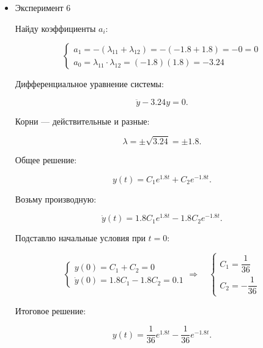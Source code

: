 \documentclass[a4paper,12pt]{article}
\begin{document}
\begin{itemize}
		Дифференциальное уравнение системы:
		
		\[
		\ddot{y} - 12.5 \dot{y} + 39 y = 0
		\]
		
		Корни — действительные и различные, значит решение имеет вид:
		
		\[
		y(t) = C_1 e^{6 t} + C_2 e^{6.5 t}
		\]
		
		Возьму производную:
		
		\[
		\dot{y}(t) = 6 C_1 e^{6 t} + 6.5 C_2 e^{6.5 t}
		\]
		
		Подставлю начальные условия при \(t = 0\):
		
		\[
		\begin{cases}
			y(0) = C_1 + C_2 = 0.05 \\[8pt]
			\dot{y}(0) = 6 C_1 + 6.5 C_2 = 0
		\end{cases} \Rightarrow \quad
		\begin{cases}
			C_1 = 0.65 \\[8pt]
			C_2 = -0.6
		\end{cases} 		
		\]
		
		Итоговое решение:
		
		\[
		y(t) = 0.65 e^{6 t} - 0.6 e^{6.5 t}
		\]
		
		
		\item Эксперимент 6
		
		Найду коэффициенты \(a_i\):
		
		\[
		\begin{cases}
			a_1 = -(\lambda_{11} + \lambda_{12}) = -(-1.8 + 1.8) = -0 = 0 \\[8pt]
			a_0 = \lambda_{11} \cdot \lambda_{12} = (-1.8)(1.8) = -3.24
		\end{cases}
		\]
		
		Дифференциальное уравнение системы:

		\[
		\ddot{y} - 3.24 y = 0.
		\]
		
		Корни — действительные и разные:
		
		\[
		\lambda = \pm \sqrt{3.24} = \pm 1.8.
		\]
		
		Общее решение:
		
		\[
		y(t) = C_1 e^{1.8 t} + C_2 e^{-1.8 t}.
		\]
		
		Возьму производную:
		
		\[
		\dot{y}(t) = 1.8 C_1 e^{1.8 t} - 1.8 C_2 e^{-1.8 t}.
		\]
		
		Подставлю начальные условия при \(t=0\):
		
		\[
		\begin{cases}
			y(0) = C_1 + C_2 = 0 \\[8pt]
			\dot{y}(0) = 1.8 C_1 - 1.8 C_2 = 0.1
		\end{cases} \Rightarrow \quad
		\begin{cases}
		C_1 = \dfrac{1}{36} \\[8pt]
		C_2 = -\dfrac{1}{36}
		\end{cases} 
		\]
		
		Итоговое решение:
		
		\[
		y(t) = \frac{1}{36} e^{1.8 t} - \frac{1}{36} e^{-1.8 t}.
		\]
		
			
		\end{itemize}
		
\end{document}
